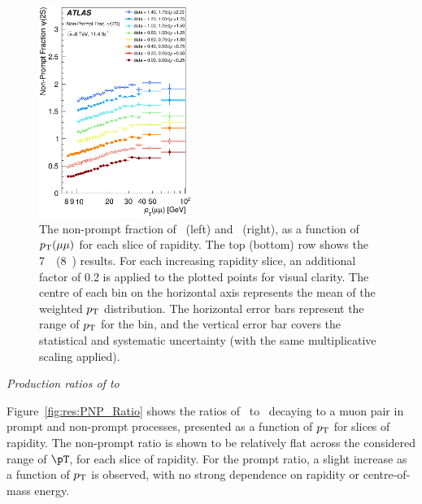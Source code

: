 \begin{description}[style=unboxed,leftmargin=0cm]
\begin{figure} [!ht]
\begin{center}
    \includegraphics[width=0.44\textwidth]{figures/ct_8TeV_NPF_Psi.eps}\hfil
    \caption{The non-prompt fraction of \jpsi\ (left) and \psiprime\ (right), as a function of $\mbox{$p_{\text{T}}$}(\mu\mu)$ for each slice of rapidity. 
    The top (bottom) row shows the 7~\TeV\ (8~\TeV) results.
      For each increasing rapidity slice, an additional factor of 0.2 is applied to the plotted points for visual clarity. The
      centre of each bin on the horizontal axis represents the mean of the weighted $\mbox{$p_{\text{T}}$}$ distribution. The
      horizontal error bars represent the range of $\mbox{$p_{\text{T}}$}$ for the bin, and the vertical error bar covers the statistical
    and systematic  uncertainty (with the same multiplicative scaling applied).}
    \label{fig:res:NPF}
  \end{center}
\end{figure} 


\textit{Production ratios of \textmd{\psiprime} to \textmd{\jpsi} }

Figure~\ref{fig:res:PNP_Ratio} shows the ratios of \psiprime\ to \jpsi\ decaying to a muon pair in prompt and non-prompt processes,
 presented as a function of $\mbox{$p_{\text{T}}$}$ for slices of rapidity. The non-prompt ratio is shown to be relatively flat across the considered range of $\pT$,
for each slice of rapidity.
For the prompt ratio, a slight increase as a function of $\mbox{$p_{\text{T}}$}$ is observed, with no strong dependence on rapidity or centre-of-mass energy.


\end{description}
